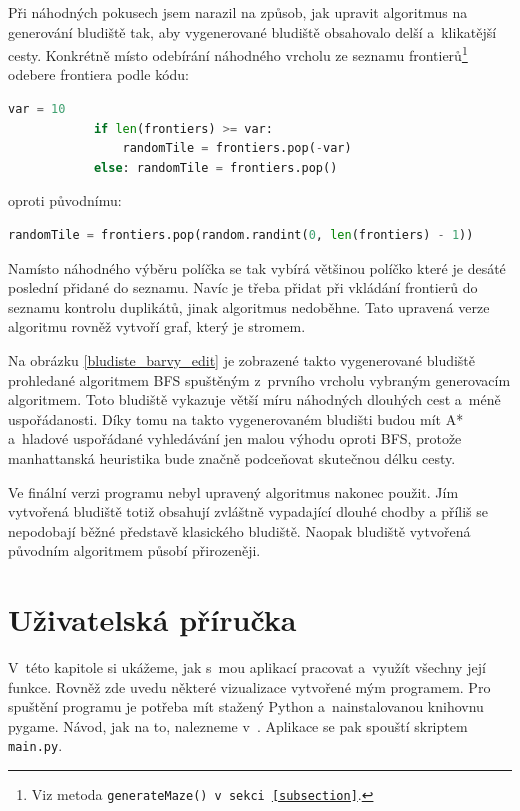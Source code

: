 \documentclass[12pt]{report}			%
\begin{document}
		
		Při náhodných pokusech jsem narazil na způsob, jak upravit algoritmus na generování bludiště tak, aby vygenerované bludiště obsahovalo delší a~klikatější cesty. Konkrétně místo odebírání náhodného vrcholu ze seznamu frontierů\footnote{Viz metoda \texttt{generateMaze() v sekci \ref{subsection}}.} odebere frontiera podle kódu:
		\lstset{numbers=none}
 		\begin{lstlisting}[language = Python]
            var = 10
            if len(frontiers) >= var:
                randomTile = frontiers.pop(-var)
            else: randomTile = frontiers.pop()
		\end{lstlisting}
		oproti původnímu:
				\begin{lstlisting}[language = Python]
randomTile = frontiers.pop(random.randint(0, len(frontiers) - 1))
		\end{lstlisting}
		\lstset{numbers=left}
		Namísto náhodného výběru políčka se tak vybírá většinou políčko které je desáté poslední přidané do seznamu. Navíc je třeba přidat při vkládání frontierů do seznamu kontrolu duplikátů, jinak algoritmus nedoběhne.
		Tato upravená verze algoritmu rovněž vytvoří graf, který je stromem.
		
		Na obrázku \ref{bludiste_barvy_edit} je zobrazené takto vygenerované bludiště prohledané algoritmem BFS spuštěným z~prvního vrcholu vybraným generovacím algoritmem. Toto bludiště vykazuje větší míru náhodných dlouhých cest a~méně uspořádanosti. Díky tomu na takto vygenerovaném bludišti budou mít A* a~hladové uspořádané vyhledávání jen malou výhodu oproti BFS, protože manhattanská heuristika bude značně podceňovat skutečnou délku cesty.
		
		Ve finální verzi programu nebyl upravený algoritmus nakonec použit. Jím vytvořená bludiště totiž obsahují zvláštně vypadající dlouhé chodby a příliš se nepodobají běžné představě klasického bludiště.
		Naopak bludiště vytvořená původním algoritmem působí přirozeněji.
		\chapter{Uživatelská příručka}
		V~této kapitole si ukážeme, jak s~mou aplikací pracovat a~využít všechny její funkce. Rovněž zde uvedu některé vizualizace vytvořené mým programem. Pro spuštění programu je potřeba mít stažený Python a~nainstalovanou knihovnu pygame. Návod, jak na to, nalezneme v~\cite{pygame_getting_started}. Aplikace se pak spouští skriptem \texttt{main.py}.
		
\end{document}
